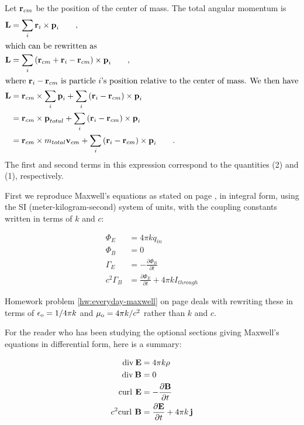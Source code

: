  Let $\textbf{r}_{cm}$ be the position of the center of mass.
The total angular momentum is
\begin{align*}
	\textbf{L}	&= \sum_i \textbf{r}_i \times \textbf{p}_i \qquad , \\
\intertext{which can be rewritten as}
	\textbf{L}	&= \sum_i \left(\textbf{r}_{cm} + \textbf{r}_i -\textbf{r}_{cm}\right) \times \textbf{p}_i \qquad ,\\
\intertext{where $\textbf{r}_i -\textbf{r}_{cm}$ is particle $i$'s position relative to the center of mass. We then have}
	\textbf{L}	&= \textbf{r}_{cm} \times \sum_i \textbf{p}_i
				+ \sum_i \left(\textbf{r}_i -\textbf{r}_{cm}\right) \times \textbf{p}_i  \\
			&= \textbf{r}_{cm} \times \textbf{p}_{total}
				+ \sum_i \left(\textbf{r}_i -\textbf{r}_{cm}\right) \times \textbf{p}_i \\
			&= \textbf{r}_{cm} \times m_{total}\textbf{v}_{cm}
				+ \sum_i \left(\textbf{r}_i -\textbf{r}_{cm}\right) \times \textbf{p}_i \qquad .
\end{align*}
The first and second terms in this expression correspond to the quantities
(2) and (1), respectively.


\noindent{}\label{maxwell-forms}

First we reproduce Maxwell's equations as stated on page \pageref{sec:maxwell}, in integral form, using the SI (meter-kilogram-second)
system of units, with the coupling constants written in terms of $k$ and $c$:

	\begin{align*}
		\Phi_E		&= 4\pi kq_{in} \\
		\Phi_B		&= 0 \\
		\Gamma_E 	&= -\frac{\partial\Phi_B}{\partial t} \\
		c^2\Gamma_B 	&= \frac{\partial\Phi_E}{\partial t}  + 4\pi k I_{through}
	\end{align*}

\noindent Homework problem \ref{hw:everyday-maxwell} on page \pageref{hw:everyday-maxwell} deals with rewriting these in terms of $\epsilon_{\textup{o}}=1/4\pi k$
and $\mu_{\textup{o}}=4\pi k/c^2$ rather than $k$ and $c$.

For the reader who has been studying the optional sections giving Maxwell's equations in \pagebreak[4]
differential form,
here is a summary:

	\begin{align*}
             \textup{div}\: \mathbf{E} &= 4\pi k \rho \\
             \textup{div}\: \mathbf{B} &= 0 \\
             \textup{curl}\:\,\mathbf{E} &= -\frac{\partial\mathbf{B}}{\partial t} \\
             c^2 \textup{curl}\:\,\mathbf{B} &= \frac{\partial\mathbf{E}}{\partial t} + 4\pi k \,\mathbf{j} 
	\end{align*}

